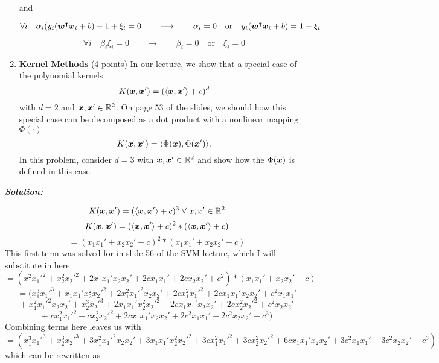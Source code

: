 \documentclass[10pt]{article}
\begin{document}
\begin{enumerate}
and 

$$ \forall i \quad \alpha_i(y_i(\boldsymbol{w}^\intercal \boldsymbol{x}_i + b) -1 + \xi_i = 0 \quad \quad \longrightarrow \quad \quad \alpha_i = 0 \quad \text{or} \quad y_i(\boldsymbol{w}^\intercal \boldsymbol{x}_i + b) = 1 - \xi_i  $$

$$ \forall i \quad \beta_i\xi_i = 0 \quad \quad \longrightarrow \quad \quad \beta_i = 0 \quad \text{or} \quad \xi_i = 0 $$


\pagebreak
\item \textbf{Kernel Methods} (4 points) In our lecture, we show that a special case of the polynomial kernels
  \begin{equation}
    K(\boldsymbol{x},\boldsymbol{x}') = (\langle \boldsymbol{x}, \boldsymbol{x}'\rangle + c)^d
  \end{equation}
  with $d=2$ and $\boldsymbol{x},\boldsymbol{x}'\in\mathbb{R}^2$.
  On page 53 of the slides, we should how this special case can be decomposed as a dot product with a nonlinear mapping $\Phi(\cdot)$
  \begin{equation}
    K(\boldsymbol{x},\boldsymbol{x}') = \langle \Phi(\boldsymbol{x}), \Phi(\boldsymbol{x}')\rangle.
  \end{equation}
  In this problem, consider $d=3$ with $\boldsymbol{x},\boldsymbol{x}'\in\mathbb{R}^2$ and show how the $\Phi(\boldsymbol{x})$ is defined in this case. 
\end{enumerate}

\hspace{\parindent}\textit{\textbf{Solution:}}

$$ K(\boldsymbol{x},\boldsymbol{x}') = (\langle \boldsymbol{x}, \boldsymbol{x}'\rangle + c)^3 \;\forall \  x,x^\prime \in\mathbb{R}^2 $$
$$ K(\boldsymbol{x},\boldsymbol{x}') = (\langle \boldsymbol{x}, \boldsymbol{x}'\rangle + c)^2 * (\langle \boldsymbol{x}, \boldsymbol{x}'\rangle + c) $$
$$ = ({x_1}{x_1'}  + {x_2}{x_2'}  + c)^2 * ({x_1}{x_1'}  + {x_2}{x_2'}  + c)$$
This first term was solved for in slide 56 of the SVM lecture, which I will substitute in here
$$  = ({x_1^2}{x_1'^2} + {x_2^2}{x_2'^2}  +  2{x_1}{x_1'}{x_2}{x_2'}  + 2c{x_1}{x_1'} + 2c{x_2}{x_2'}+c^2 )* ({x_1}{x_1'}  + {x_2}{x_2'}  + c)$$
$$ = ({x_1^3}{x_1'^3} + {x_1}{x_1'}{x_2^2}{x_2'^2} + 2{x_1^2}{x_1'^2}{x_2}{x_2'} +  2c{x_1^2}{x_1'^2} + 2c{x_1}{x_1'}{x_2}{x_2'} + c^2 {x_1}{x_1'} $$
$$ + \; {x_1^2}{x_1'^2}{x_2}{x_2'} + {x_2^3}{x_2'^3} + 2{x_1}{x_1'}{x_2^2}{x_2'^2} + 2c{x_1}{x_1'}{x_2}{x_2'}  + 2c{x_2^2}{x_2'^2} + c^2 {x_2}{x_2'} $$
$$ +  \;c{x_1^2}{x_1'^2} + c{x_2^2}{x_2'^2} + 2c{x_1}{x_1'}{x_2}{x_2'} + 2c^2{x_1}{x_1'} + 2c^2{x_2}{x_2'} + c^3 )$$
Combining terms here leaves us with
$$ = ({x_1^3}{x_1'^3} + {x_2^3}{x_2'^3}  + 3{x_1^2}{x_1'^2}{x_2}{x_2'} + 3{x_1}{x_1'}{x_2^2}{x_2'^2} + 3 c{x_1^2}{x_1'^2} +  3c{x_2^2}{x_2'^2} + 6c{x_1}{x_1'}{x_2}{x_2'} + 3c^2{x_1}{x_1'} + 3c^2{x_2}{x_2'} + c^3 ) $$
which can be rewritten as
\end{document}
